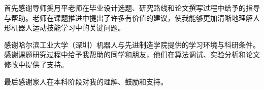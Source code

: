\begin{acknowledgements}

首先感谢导师奚月平老师在毕业设计选题、研究路线和论文撰写过程中给予的指导与帮助。老师在课题推进中提出了许多有价值的建议，使我能够更加清晰地理解人形机器人运动技能学习中的关键问题。

感谢哈尔滨工业大学（深圳）机器人与先进制造学院提供的学习环境与科研条件。感谢课题研究过程中给予我帮助的同学和朋友，他们在算法调试、实验分析和论文修改中提供了支持。

最后感谢家人在本科阶段对我的理解、鼓励和支持。


\end{acknowledgements}
